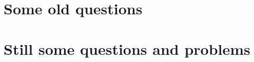 
\section{Some old questions}


\newcommand{\refprob}[1]{\ref{#1}, page \pageref{#1}}

\section{Still some questions and problems}


